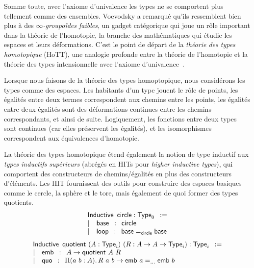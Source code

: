 Somme toute, avec l'axiome d'univalence les types ne se comportent plus 
tellement comme des ensembles. 
% 
Voevodsky a remarqué qu'ils ressemblent bien plus à des 
\emph{\( \infty \)-groupoïdes faibles}, un gadget catégorique qui joue un rôle 
important dans la théorie de l'homotopie, la branche des mathématiques qui 
étudie les espaces et leurs déformations. 
% 
C'est le point de départ de la \emph{théorie des types homotopique} (HoTT), une 
analogie profonde entre la théorie de l'homotopie et la théorie des types 
intensionnelle avec l'axiome d'univalence~\cite{hottbook}.

Lorsque nous faisons de la théorie des types homoptopique, nous considérons les 
types comme des espaces. Les habitants d'un type jouent le rôle de points, 
les égalités entre deux termes correspondent aux chemins entre les points, les 
égalités entre deux égalités sont des déformations continues entre les chemins 
correspondants, et ainsi de suite. 
% 
Logiquement, les fonctions entre deux types sont continues (car elles
préservent les égalités), et les isomorphismes correspondent aux équivalences 
d'homotopie. 

La théorie des types homotopique étend également la notion de type inductif 
aux \emph{types inductifs supérieurs} (abrégés en HITs pour \emph{higher inductive types}), 
qui comportent des constructeurs de chemins/égalités en plus des constructeurs d'éléments. 
% 
Les HIT fournissent des outils pour construire des espaces basiques comme le cercle, 
la sphère et le tore, mais également de quoi former des types quotients.
% 
\[
\begin{array}{l}
\mathsf{Inductive}\enskip\mathsf{circle} : \varType_0\enskip := \\
\sep \quad \mathsf{base} \enskip : \enskip \mathsf{circle}\\
\sep \quad \mathsf{loop} \enskip : \enskip \Indeq{\mathsf{circle}}{\mathsf{base}}{\mathsf{base}} \\
\end{array}
\]
\[
\begin{array}{l}
\mathsf{Inductive}\enskip\mathsf{quotient}\ (A : \varType_i)\ (R : A \to A \to \varType_i) : \varType_i\enskip := \\
\sep \quad \mathsf{emb} \enskip : \enskip A \to \mathsf{quotient}\ A\ R \\
\sep \quad \mathsf{quo} \enskip : \enskip \Depfun[a\ b]{A}{R\ a\ b \to \Indeq{...}{\mathsf{emb}\ a}{\mathsf{emb}\ b}} \\
\end{array}
\]

